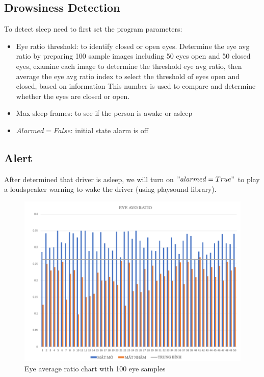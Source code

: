     \subsection{Drowsiness Detection}
        To detect sleep need to first set the program parameters: 
        \begin{itemize}
            \item Eye ratio threshold: to identify closed or open eyes. Determine the eye avg ratio by preparing 100 sample images including 50 
            eyes open and 50 closed eyes, examine each image to determine the threshold eye avg ratio, then average the eye avg ratio index to 
            select the threshold of eyes open and closed, based on information This number is used to compare and determine whether the eyes are 
            closed or open.
            \item Max sleep frames: to see if the person is awake or asleep
            \item $Alarmed = False$: initial state alarm is off 
        \end{itemize}

    \subsection{Alert}
        After determined that driver is asleep, we will turn on $"alarmed = True"$ to play a loudspeaker warning to wake the driver (using playsound library).
        \begin{figure}[H]
            \centering
            \includegraphics[width=0.6\linewidth]{img/eye-avg-ratio.png}
            \caption{Eye average ratio chart with 100 eye samples}
        \end{figure}